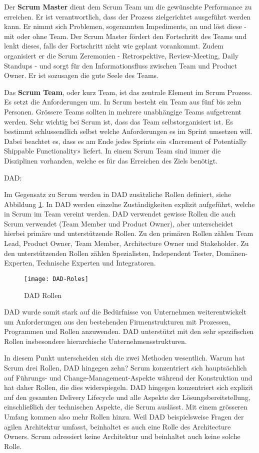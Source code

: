 Der \textbf{Scrum Master} dient dem Scrum Team um die gewünschte Performance zu erreichen. Er ist verantwortlich, dass der Prozess zielgerichtet ausgeführt werden kann. Er nimmt sich Problemen, sogenannten Impediments, an und löst diese - mit oder ohne Team. Der Scrum Master fördert den Fortschritt des Teams und lenkt dieses, falls der Fortschritt nicht wie geplant vorankommt. Zudem organisiert er die Scrum Zeremonien - Retrospektive, Review-Meeting, Daily Standups - und sorgt für den Informationsfluss zwischen Team und Product Owner. Er ist sozusagen die gute Seele des Teams. \medskip

Das \textbf{Scrum Team}, oder kurz Team, ist das zentrale Element im Scrum Prozess. Es setzt die Anforderungen um. In Scrum besteht ein Team aus fünf bis zehn Personen. Grössere Teams sollten in mehrere unabhängige Teams aufgetrennt werden. Sehr wichtig bei Scrum ist, dass das Team selbstorganisiert ist. Es bestimmt schlussendlich selbst welche Anforderungen es im Sprint umsetzen will. Dabei beachtet es, dass es am Ende jedes Sprints ein «Increment of  Potentially Shippable Functionality» liefert. In einem Scrum Team sind immer die Disziplinen vorhanden, welche es für das Erreichen des Ziels benötigt.
\bigskip

{\Large DAD:} \cite{dadRoles} \medskip

Im Gegensatz zu Scrum werden in DAD zusätzliche Rollen definiert, siehe Abbildung \ref{fig:dadrollen}. In DAD werden einzelne Zuständigkeiten explizit aufgeführt, welche in Scrum im Team vereint werden. DAD verwendet gewisse Rollen die auch Scrum verwendet (Team Member und Product Owner), aber unterscheidet hierbei primäre und unterstützende Rollen. Zu den primären Rollen zählen Team Lead, Product Owner, Team Member, Architecture Owner und Stakeholder. Zu den unterstützenden Rollen zählen Spezialisten, Independent Tester, Domänen-Experten, Technische Experten und Integratoren.

\begin{figure}[H]
	\centering
	\texttt{[image: DAD-Roles]}
	\caption{DAD Rollen \cite{dadRoles}}
	\label{fig:dadrollen}
\end{figure}

DAD wurde somit stark auf die Bedürfnisse von Unternehmen weiterentwickelt um Anforderungen aus den bestehenden Firmenstrukturen mit Prozessen, Programmen und Rollen anzuwenden. DAD unterstützt mit den sehr spezifischen Rollen insbesondere hierarchische Unternehmensstrukturen.
\bigskip


In diesem Punkt unterscheiden sich die zwei Methoden wesentlich. Warum hat Scrum drei Rollen, DAD hingegen zehn? Scrum konzentriert sich hauptsächlich auf Führungs- und Change-Management-Aspekte während der Konstruktion und hat daher Rollen, die dies widerspiegeln. DAD hingegen konzentriert sich explizit auf den gesamten Delivery Lifecycle und alle Aspekte der Lösungsbereitstellung, einschließlich der technischen Aspekte, die Scrum auslässt. Mit einem grösseren Umfang kommen also mehr Rollen hinzu. Weil DAD beispielsweise Fragen der agilen Architektur umfasst, beinhaltet es auch eine Rolle des Architecture Owners. Scrum adressiert keine Architektur und beinhaltet auch keine solche Rolle.

